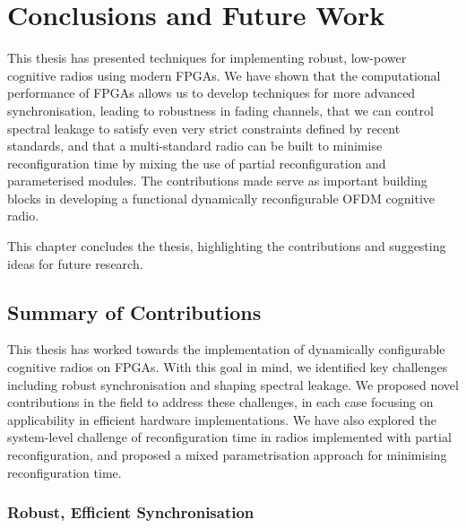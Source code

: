 \chapter{Conclusions and Future Work}
\label{chap:conclusion}
This thesis has presented techniques for implementing robust, low-power cognitive radios using modern FPGAs. We have shown that the computational performance of FPGAs allows us to develop techniques for more advanced synchronisation, leading to robustness in fading channels, that we can control spectral leakage to satisfy even very strict constraints defined by recent standards, and that a multi-standard radio can be built to minimise reconfiguration time by mixing the use of partial reconfiguration and parameterised modules. The contributions made serve as important building blocks in developing a functional dynamically reconfigurable OFDM cognitive radio.

This chapter concludes the thesis, highlighting the contributions and suggesting ideas for future research.

\section{Summary of Contributions}

This thesis has worked towards the implementation of dynamically configurable cognitive radios on FPGAs.
With this goal in mind, we identified key challenges including robust synchronisation and shaping spectral leakage.
We proposed novel contributions in the field to address these challenges, in each case focusing on applicability in efficient hardware implementations.
We have also explored the system-level challenge of reconfiguration time in radios implemented with partial reconfiguration, and proposed a mixed parametrisation approach for minimising reconfiguration time.

\subsection{Robust, Efficient Synchronisation}

